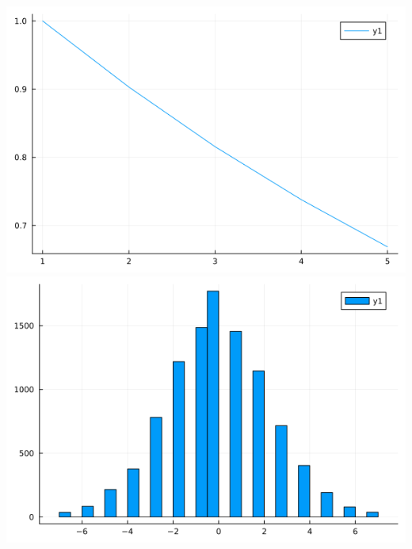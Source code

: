 \documentclass{article}
\begin{document}
\begin{center}
    \includegraphics[scale = 0.6]{p3.png} \\
    \includegraphics[scale = 0.6]{p8.png} \\

    

\end{center}
\end{document}
